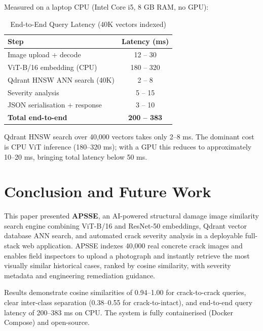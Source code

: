 \documentclass[conference]{IEEEtran}
\begin{document}
Measured on a laptop CPU (Intel Core i5, 8 GB RAM, no GPU):

\begin{table}[H]
  \caption{End-to-End Query Latency (40K vectors indexed)}
  \label{tab:latency}
  \centering
  \renewcommand{\arraystretch}{1.2}
  \begin{tabular}{lc}
    \toprule
    \textbf{Step}                    & \textbf{Latency (ms)} \\
    \midrule
    Image upload + decode            & 12 -- 30   \\
    ViT-B/16 embedding (CPU)         & 180 -- 320 \\
    Qdrant HNSW ANN search (40K)     & 2 -- 8     \\
    Severity analysis                & 5 -- 15    \\
    JSON serialisation + response    & 3 -- 10    \\
    \midrule
    \textbf{Total end-to-end}        & \textbf{200 -- 383} \\
    \bottomrule
  \end{tabular}
\end{table}

Qdrant HNSW search over 40,000 vectors takes only 2--8 ms. The dominant cost is CPU ViT inference (180--320 ms); with a GPU this reduces to approximately 10--20 ms, bringing total latency below 50 ms.

\section{Conclusion and Future Work}

This paper presented \textbf{APSSE}, an AI-powered structural damage image similarity search engine combining ViT-B/16 and ResNet-50 embeddings, Qdrant vector database ANN search, and automated crack severity analysis in a deployable full-stack web application. APSSE indexes 40,000 real concrete crack images and enables field inspectors to upload a photograph and instantly retrieve the most visually similar historical cases, ranked by cosine similarity, with severity metadata and engineering remediation guidance.

Results demonstrate cosine similarities of 0.94--1.00 for crack-to-crack queries, clear inter-class separation (0.38--0.55 for crack-to-intact), and end-to-end query latency of 200--383 ms on CPU. The system is fully containerised (Docker Compose) and open-source.
\end{document}
